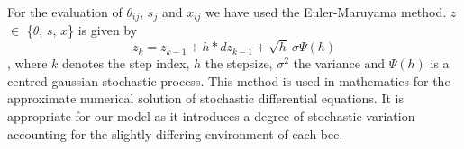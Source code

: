 For the evaluation of $\theta_{ij}$, $s_{j}$ and $x_{ij}$ we have used the Euler-Maruyama method. $z$ $\in$ \{$\theta$, $s$, $x$\} is given by
\begin{equation}
z_{k}=z_{k-1} + h*dz_{k-1}+\sqrt{h}\ \sigma \Psi(h)
\end{equation} 
, where $k$ denotes the step index, $h$ the stepsize, $\sigma^{2}$ the variance and $\Psi(h)$ is a centred gaussian stochastic process. This method is used in mathematics for the approximate numerical solution of stochastic differential equations. It is appropriate for our model as it introduces a degree of stochastic variation accounting for the slightly differing environment of each bee.

